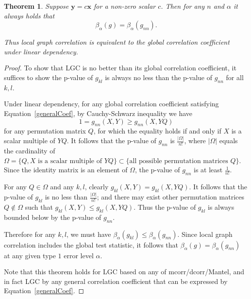 \documentclass[11pt]{article}
\providecommand{\mb}[1]{\boldsymbol{#1}}
\newtheorem{thm}{Theorem}
\begin{document}
\begin{thm}
Suppose $\mb{y}=c\mb{x}$ for a non-zero scalar $c$. Then for any $n$ and $\alpha$ it always holds that
\begin{equation}
\beta_{\alpha}(g) = \beta_{\alpha}(g_{nn}).
\end{equation}

Thus local graph correlation is equivalent to the global correlation coefficient under linear dependency.
\end{thm}
\begin{proof}
To show that LGC is no better than its global correlation coefficient, it suffices to show the p-value of $g_{kl}$ is always no less than the p-value of $g_{nn}$ for all $k,l$.


Under linear dependency, for any global correlation coefficient satisfying Equation~\ref{generalCoef}, by Cauchy-Schwarz inequality we have
\begin{equation}
1=g_{nn}(X, Y) \geq g_{nn}(X, YQ)
\end{equation}
for any permutation matrix $Q$, for which the equality holds if and only if $X$ is a scalar multiple of $YQ$. It follows that the p-value of $g_{nn}$ is $\frac{|\Omega|}{n!}$, where $|\Omega|$ equals the cardinality of $\Omega=\{Q, X \mbox{ is a scalar multiple of }YQ\} \subset \{\mbox{all possible permutation matrices }Q\}$. Since the identity matrix is an element of $\Omega$, the p-value of $g_{nn}$ is at least $\frac{1}{n!}$.

For any $Q \in \Omega$ and any $k,l$, clearly $g_{kl}(X,Y)=g_{kl}(X,YQ)$. It follows that the p-value of $g_{kl}$ is no less than $\frac{|\Omega|}{n!}$; and there may exist other permutation matrices $Q \notin \Omega$ such that $g_{kl}(X,Y) \leq g_{kl}(X,YQ)$. Thus the p-value of $g_{kl}$ is always bounded below by the p-value of $g_{nn}$.

Therefore for any $k,l$, we must have $\beta_{\alpha}(g_{kl}) \leq \beta_{\alpha}(g_{nn})$. Since local graph correlation includes the global test statistic, it follows that $\beta_{\alpha}(g) = \beta_{\alpha}(g_{nn})$ at any given type $1$ error level $\alpha$.

Note that this theorem holds for LGC based on any of mcorr/dcorr/Mantel, and in fact LGC by any general correlation coefficient that can be expressed by Equation~\ref{generalCoef}.
\end{proof}
\end{document}
